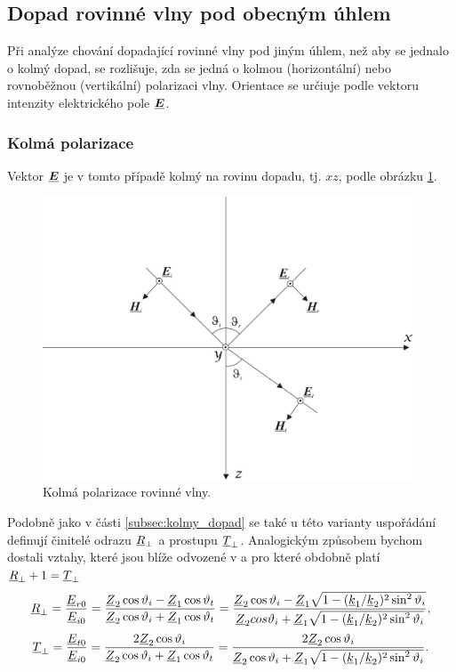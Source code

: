 \subsection{Dopad rovinné vlny pod obecným úhlem}
Při analýze chování dopadající rovinné vlny pod jiným úhlem, než aby se jednalo o kolmý dopad, se rozlišuje, zda se jedná o kolmou (horizontální) nebo rovnoběžnou (vertikální) polarizaci vlny. Orientace se určiuje podle vektoru intenzity elektrického pole $\mbox{\underline{\boldmath$E$}}$.
\subsubsection*{Kolmá polarizace}
Vektor $\mbox{\underline{\boldmath$E$}}$ je v tomto případě kolmý na rovinu dopadu, tj. $xz$, podle obrázku \ref{obr:evlny_kolma_polarizace}.
\begin{figure}[!h]
	\centering
	\includegraphics[width=11cm]{evlny_kolma_polarizace.png}
	\caption{Kolmá polarizace rovinné vlny.\cite{emp}}
	\label{obr:evlny_kolma_polarizace}
\end{figure}
Podobně jako v části \ref{subsec:kolmy_dopad} se také u této varianty uspořádání definují činitelé odrazu ${\underline{R}}_{\perp}$ a prostupu ${\underline{T}}_{\perp}$. Analogickým způsobem bychom dostali vztahy, které jsou blíže odvozené v \cite[str. 94]{emp} a pro které obdobně platí ${\underline{R}}_{\perp} + 1 = {\underline{T}}_{\perp}$
\begin{equation}
	{\underline{R}}_{\perp} = \frac{{\underline{E}}_{r0}}{{\underline{E}}_{i0}} = \frac{{\underline{Z}}_{2}\cos\vartheta_{i}-{\underline{Z}}_{1}\cos\vartheta_{t}}{{\underline{Z}}_{2}\cos\vartheta_{i}+{\underline{Z}}_{1}\cos\vartheta_{t}} = \frac{{\underline{Z}}_{2}\cos\vartheta_{i}-{\underline{Z}}_{1}\sqrt{1-({\underline{k}}_{1}/{\underline{k}}_{2})^{2}\sin^{2}\vartheta_{i}}}{{\underline{Z}}_{2}cos\vartheta_{i}+{\underline{Z}}_{1}\sqrt{1-({\underline{k}}_{1}/{\underline{k}}_{2})^{2}\sin^{2}\vartheta_{i}}},
	\label{rce:evlny_cin_odrazu_kolma}
\end{equation}
\begin{equation}
	{\underline{T}}_{\perp} = \frac{{\underline{E}}_{t0}}{{\underline{E}}_{i0}} = \frac{2{\underline{Z}}_{2}\cos\vartheta_{i}}{{\underline{Z}}_{2}\cos\vartheta_{i}+{\underline{Z}}_{1}\cos\vartheta_{t}} = \frac{2{\underline{Z}}_{2}\cos\vartheta_{i}}{{\underline{Z}}_{2}\cos\vartheta_{i}+{\underline{Z}}_{1}\sqrt{1-({\underline{k}}_{1}/{\underline{k}}_{2})^{2}\sin^{2}\vartheta_{i}}}.
	\label{rce:evlny_cin_prostupu_kolma}
\end{equation}

